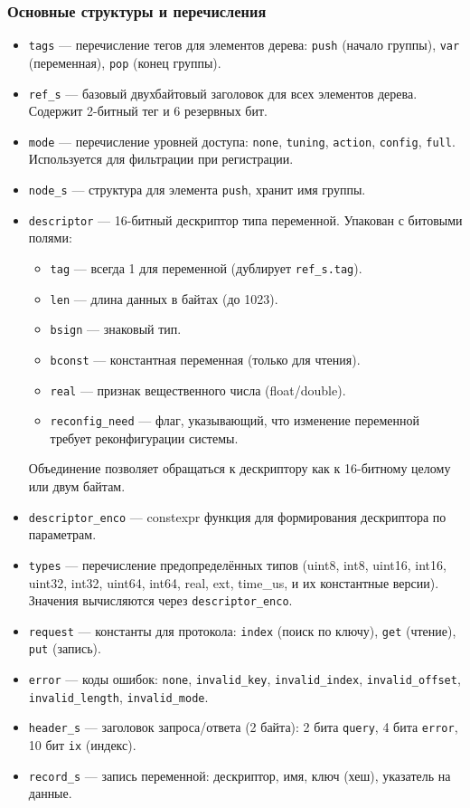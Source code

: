 \documentclass[a4paper,12pt]{article}
\begin{document}
\subsubsection{Основные структуры и перечисления}

\begin{itemize}
    \item \texttt{tags} — перечисление тегов для элементов дерева: \texttt{push} (начало группы), \texttt{var} (переменная), \texttt{pop} (конец группы).
    \item \texttt{ref\_s} — базовый двухбайтовый заголовок для всех элементов дерева. Содержит 2-битный тег и 6 резервных бит.
    \item \texttt{mode} — перечисление уровней доступа: \texttt{none}, \texttt{tuning}, \texttt{action}, \texttt{config}, \texttt{full}. Используется для фильтрации при регистрации.
    \item \texttt{node\_s} — структура для элемента \texttt{push}, хранит имя группы.
    \item \texttt{descriptor} — 16-битный дескриптор типа переменной. Упакован с битовыми полями:
        \begin{itemize}
            \item \texttt{tag} — всегда 1 для переменной (дублирует \texttt{ref\_s.tag}).
            \item \texttt{len} — длина данных в байтах (до 1023).
            \item \texttt{bsign} — знаковый тип.
            \item \texttt{bconst} — константная переменная (только для чтения).
            \item \texttt{real} — признак вещественного числа (float/double).
            \item \texttt{reconfig\_need} — флаг, указывающий, что изменение переменной требует реконфигурации системы.
        \end{itemize}
        Объединение позволяет обращаться к дескриптору как к 16-битному целому или двум байтам.
    \item \texttt{descriptor\_enco} — constexpr функция для формирования дескриптора по параметрам.
    \item \texttt{types} — перечисление предопределённых типов (uint8, int8, uint16, int16, uint32, int32, uint64, int64, real, ext, time\_us, и их константные версии). Значения вычисляются через \texttt{descriptor\_enco}.
    \item \texttt{request} — константы для протокола: \texttt{index} (поиск по ключу), \texttt{get} (чтение), \texttt{put} (запись).
    \item \texttt{error} — коды ошибок: \texttt{none}, \texttt{invalid\_key}, \texttt{invalid\_index}, \texttt{invalid\_offset}, \texttt{invalid\_length}, \texttt{invalid\_mode}.
    \item \texttt{header\_s} — заголовок запроса/ответа (2 байта): 2 бита \texttt{query}, 4 бита \texttt{error}, 10 бит \texttt{ix} (индекс).
    \item \texttt{record\_s} — запись переменной: дескриптор, имя, ключ (хеш), указатель на данные.
\end{itemize}
\end{document}
